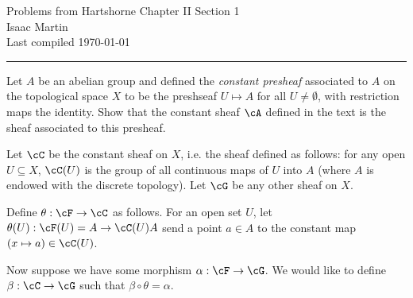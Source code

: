 


\pagestyle{empty}
	\LARGE
\begin{center}
	Problems from Hartshorne Chapter II Section 1 \\
	\Large
	Isaac Martin \\
    Last compiled \today
\end{center}
\normalsize
\vspace{-2mm}
\hrule
\begin{homework}[e]
	\prob Let $A$ be an abelian group and defined the \emph{constant presheaf} associated to $A$ on the topological space $X$ to be the preshseaf $U\mapsto A$ for all $U\neq \emptyset$, with restriction maps the identity. Show that the constant sheaf $\cA$ defined in the text is the sheaf associated to this presheaf.
	\begin{prf}
		Let $\cC$ be the constant sheaf on $X$, i.e. the sheaf defined as follows: for any open $U\subseteq X$, $\cC(U)$ is the group of all continuous maps of $U$ into $A$ (where $A$ is endowed with the discrete topology). Let $\cG$ be any other sheaf on $X$.

		Define $\theta:\cF\to \cC$ as follows. For an open set $U$, let $\theta(U):\cF(U) = A\to \cC(U)A$ send a point $a \in A$ to the constant map $(x \mapsto a)\in \cC(U)$.

		Now suppose we have some morphism $\alpha:\cF\to \cG$. We would like to define $\beta:\cC\to \cG$ such that $\beta\circ\theta = \alpha$.


\end{prf}
\end{homework}
